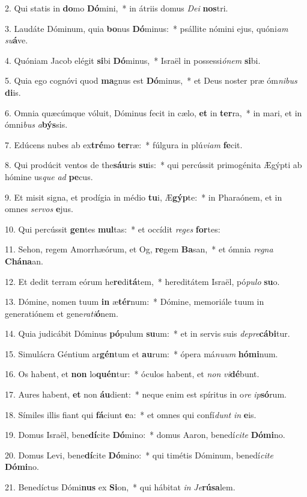 2. Qui statis in \textbf{do}mo \textbf{Dó}mini,~*  in átriis domus \textit{De}\textit{i} \textbf{nos}tri.\

3. Laudáte Dóminum, quia \textbf{bo}nus \textbf{Dó}minus:~*  psállite nómini ejus, quóni\textit{am} \textit{su}\textbf{á}ve.\

4. Quóniam Jacob elégit \textbf{si}bi \textbf{Dó}minus,~*  Israël in possessi\textit{ó}\textit{nem} \textbf{si}bi.\

5. Quia ego cognóvi quod \textbf{ma}gnus est \textbf{Dó}minus,~*  et Deus noster præ óm\textit{ni}\textit{bus} \textbf{di}is.\

6. Omnia quæcúmque vóluit, Dóminus fecit in cælo, \textbf{et} in \textbf{ter}ra,~*  in mari, et in ómni\textit{bus} \textit{a}\textbf{býs}sis.\

7. Edúcens nubes ab ex\textbf{tré}mo \textbf{ter}ræ:~*  fúlgura in plú\textit{vi}\textit{am} \textbf{fe}cit.\

8. Qui prodúcit ventos de the\textbf{sáu}ris \textbf{su}is:~*  qui percússit primogénita Ægýpti ab hómine us\textit{que} \textit{ad} \textbf{pe}cus.\

9. Et misit signa, et prodígia in médio \textbf{tu}i, Æ\textbf{gýp}te:~*  in Pharaónem, et in omnes \textit{ser}\textit{vos} \textbf{e}jus.\

10. Qui percússit \textbf{gen}tes \textbf{mul}tas:~*  et occídit \textit{re}\textit{ges} \textbf{for}tes:\

11. Sehon, regem Amorrhæórum, et Og, \textbf{re}gem \textbf{Ba}san,~*  et ómnia \textit{re}\textit{gna} \textbf{Chá}\textbf{na}an.\

12. Et dedit terram eórum he\textbf{re}di\textbf{tá}tem,~*  hereditátem Israël, pó\textit{pu}\textit{lo} \textbf{su}o.\

13. Dómine, nomen tuum \textbf{in} æ\textbf{tér}num:~*  Dómine, memoriále tuum in generatiónem et gene\textit{ra}\textit{ti}\textbf{ó}nem.\

14. Quia judicábit Dóminus \textbf{pó}pulum \textbf{su}um:~*  et in servis suis \textit{de}\textit{pre}\textbf{cá}\textbf{bi}tur.\

15. Simulácra Géntium ar\textbf{gén}tum et \textbf{au}rum:~*  ópera má\textit{nu}\textit{um} \textbf{hó}\textbf{mi}num.\

16. Os habent, et \textbf{non} lo\textbf{quén}tur:~*  óculos habent, et \textit{non} \textit{vi}\textbf{dé}bunt.\

17. Aures habent, \textbf{et} non \textbf{áu}dient:~*  neque enim est spíritus in o\textit{re} \textit{ip}\textbf{só}rum.\

18. Símiles illis fiant qui \textbf{fá}ciunt \textbf{e}a:~*  et omnes qui confí\textit{dunt} \textit{in} \textbf{e}is.\

19. Domus Israël, bene\textbf{dí}cite \textbf{Dó}mino:~*  domus Aaron, benedí\textit{ci}\textit{te} \textbf{Dó}\textbf{mi}no.\

20. Domus Levi, bene\textbf{dí}cite \textbf{Dó}mino:~*  qui timétis Dóminum, benedí\textit{ci}\textit{te} \textbf{Dó}\textbf{mi}no.\

21. Benedíctus Dómi\textbf{nus} ex \textbf{Si}on,~*  qui hábitat \textit{in} \textit{Je}\textbf{rú}\textbf{sa}lem.\

